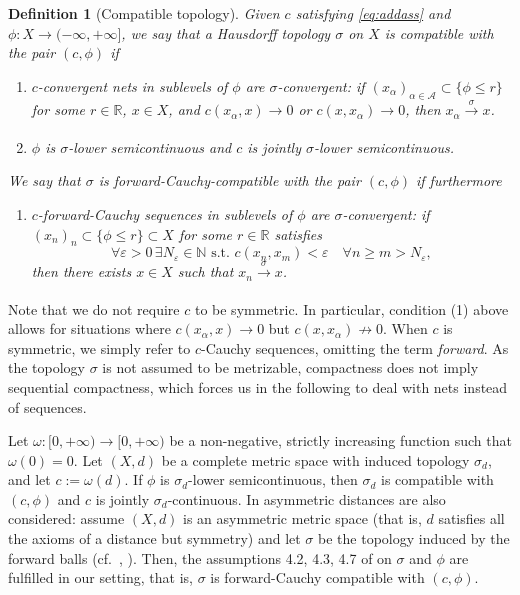 \documentclass[reqno]{amsart}
\newcounter{results}[section]
\theoremstyle{plain}
\theoremstyle{remark}
\theoremstyle{plain}
\newtheorem{definition}[results]{Definition}
\numberwithin{equation}{section}
\theoremstyle{remark}
\newenvironment{continuance}[1]
  {\newcommand\continuanceref{\ref{#1}}\continuancex}
  {\endcontinuancex}
\newcommand{\N}{\mathbb{N}}
\newcommand{\R}{\mathbb{R}}
\newcommand{\calA}{\mathcal{A}}
\newcommand{\eps}{\varepsilon}
\begin{document}
\begin{definition}[Compatible topology]\label{def:comp} Given $c$ satisfying \eqref{eq:addass} and  $\phi:X \to (-\infty,+\infty]$,   we say that a Hausdorff topology $\sigma$ on $X$ is \emph{compatible with the pair $(c,\phi)$}  if
\begin{enumerate}
    \item[\rm (1)]\label{it:sigma_c_conv} $c$-convergent nets in sublevels of $\phi$ are $\sigma$-convergent: if $(x_\alpha)_{\alpha\in \calA} \subset \{ \phi \le r  \}$ for some $r  \in \R$, $x \in X$, and $c(x_\alpha, x) \to 0$ or $c(x,x_\alpha) \to 0$, then $x_\alpha \xrightarrow[]{\sigma} x$.
    \item[\rm (2)]\label{it:sigma_c_g_lsc} $\phi$ is $\sigma$-lower semicontinuous and $c$  is jointly $\sigma$-lower semicontinuous.
\end{enumerate}
We say that  $\sigma$ is \emph{forward-Cauchy-compatible with the pair $(c,\phi)$} if furthermore 
\begin{enumerate}
    \item[\rm (3)] $c$-forward-Cauchy sequences in sublevels of $\phi$ are $\sigma$-convergent: if $(x_n)_n \subset \{ \phi \le r  \} \subset X$ for some $r  \in \R$ satisfies
    \[ \forall \eps >0  \,\exists N_{\eps} 
    \in \N \text{ s.t. } c(x_n, x_m) < \eps \quad \forall   n \ge m > N_\eps ,\]
    then there exists $x\in X$ such that $x_n \xrightarrow[]{\sigma} x$.
    \end{enumerate}
\end{definition}

Note that we do not require $c$ to be symmetric. In particular,  condition (1) above  allows for situations where $c(x_\alpha, x) \to 0$ but $c(x, x_\alpha) \not\to 0$. When $c$ is symmetric,  we simply refer to  $c$-Cauchy sequences, omitting the term {\it forward}.  
As  the topology $\sigma$ is not assumed to be metrizable,  compactness
does not imply sequential compactness,  which forces us  in the following  to   deal with nets instead of sequences.

\begin{continuance}{ex:distance} Let $\omega: [0,+\infty) \to [0,+\infty)$ be a non-negative, strictly increasing function such that $\omega(0)=0$. Let $(X, d)$ be a complete metric space with induced topology $\sigma_d$, and let $c:= \omega(d)$. If $\phi$ is $\sigma_d$-lower semicontinuous, then $\sigma_d$ is compatible with $(c,\phi)$ and $c$ is jointly $\sigma_d$-continuous. In \cite{Chenchiah2009,Rossi2009,Ohta2023} asymmetric distances are also considered: assume $(X, d)$ is an asymmetric metric space (that is, $d$ satisfies all the axioms of a distance but symmetry) and let $\sigma$ be the topology induced by the forward balls (cf.~\cite[Definition 2.1]{Ohta2023}, \cite[Definition 2.1]{Chenchiah2009}). Then, the assumptions 4.2, 4.3, 4.7 of \cite{Chenchiah2009} on $\sigma$ and $\phi$  are fulfilled in  our setting, that is, $\sigma$ is forward-Cauchy compatible with $(c,\phi)$.
\end{continuance}
\end{document}
